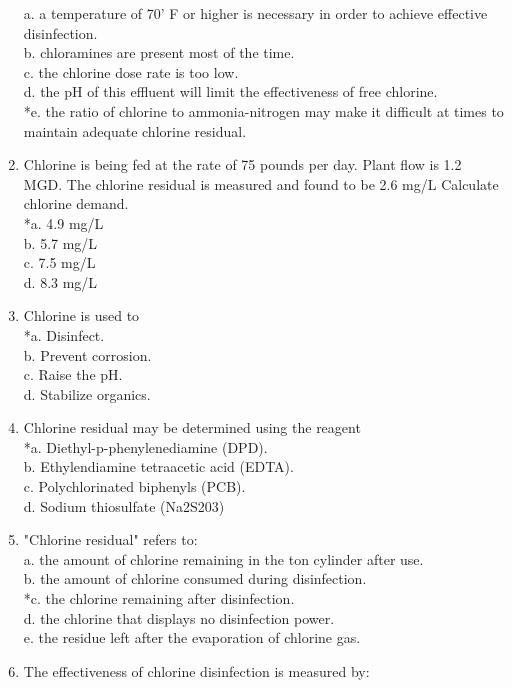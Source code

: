 \begin{enumerate}
a. a temperature of 70' F or higher is necessary in order to achieve effective disinfection. \\
b. chloramines are present most of the time. \\
c. the chlorine dose rate is too low. \\
d. the pH of this effluent will limit the effectiveness of free chlorine. \\
*e. the ratio of chlorine to ammonia-nitrogen may make it difficult at times to maintain adequate chlorine residual. \\
\item Chlorine is being fed at the rate of 75 pounds per day. Plant flow is 1.2 MGD. The chlorine residual is measured and found to be 2.6 mg/L Calculate chlorine demand. \\
*a. 4.9 mg/L \\
b. 5.7 mg/L \\
c. 7.5 mg/L \\
d. 8.3 mg/L \\
\item Chlorine is used to \\
*a. Disinfect. \\
b. Prevent corrosion. \\
c. Raise the pH. \\
d. Stabilize organics. \\
\item Chlorine residual may be determined using the reagent \\
*a. Diethyl-p-phenylenediamine (DPD). \\
b. Ethylendiamine tetraacetic acid (EDTA). \\
c. Polychlorinated biphenyls (PCB). \\
d. Sodium thiosulfate (Na2S203) \\
\item "Chlorine residual" refers to: \\
a. the amount of chlorine remaining in the ton cylinder after use. \\
b. the amount of chlorine consumed during disinfection. \\
*c. the chlorine remaining after disinfection. \\
d. the chlorine that displays no disinfection power. \\
e. the residue left after the evaporation of chlorine gas. \\
\item The effectiveness of chlorine disinfection is measured by: \\

\end{enumerate}

